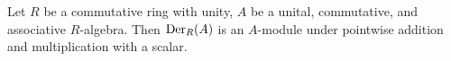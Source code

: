 \begin{proposition}
  Let $R$ be a commutative ring with unity,
  $A$ be a unital, commutative, and associative $R$-algebra.
  Then ${\rm Der}_R(A)$ is an $A$-module under pointwise addition and
  multiplication with a scalar.
\end{proposition}
